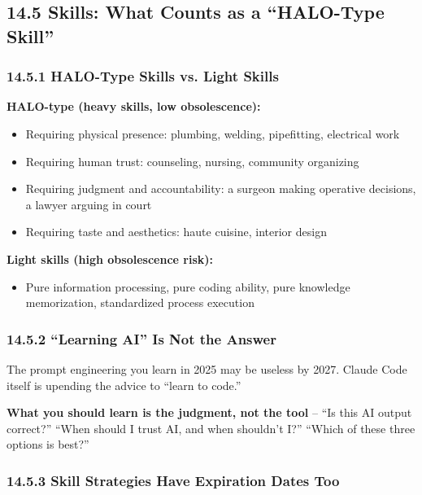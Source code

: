 \documentclass[11pt,a4paper]{article}
\begin{document}
\subsection{14.5 Skills: What Counts as a ``HALO-Type Skill''}

\subsubsection{14.5.1 HALO-Type Skills vs. Light Skills}

\textbf{HALO-type (heavy skills, low obsolescence):}

\begin{itemize}
  \item Requiring physical presence: plumbing, welding, pipefitting, electrical work
  \item Requiring human trust: counseling, nursing, community organizing
  \item Requiring judgment and accountability: a surgeon making operative decisions, a lawyer arguing in court
  \item Requiring taste and aesthetics: haute cuisine, interior design
\end{itemize}

\textbf{Light skills (high obsolescence risk):}

\begin{itemize}
  \item Pure information processing, pure coding ability, pure knowledge memorization, standardized process execution
\end{itemize}

\subsubsection{14.5.2 ``Learning AI'' Is Not the Answer}

The prompt engineering you learn in 2025 may be useless by 2027. Claude Code itself is upending the advice to ``learn to code.''

\textbf{What you should learn is the judgment, not the tool} -- ``Is this AI output correct?'' ``When should I trust AI, and when shouldn't I?'' ``Which of these three options is best?''

\subsubsection{14.5.3 Skill Strategies Have Expiration Dates Too}
\end{document}
